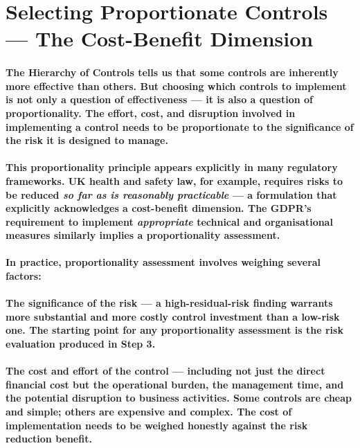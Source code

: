 \section{Selecting Proportionate Controls — The Cost-Benefit Dimension}
\paragraph{The Hierarchy of Controls tells us that some controls are inherently more effective than others. But choosing which controls to implement is not only a question of effectiveness — it is also a question of proportionality. The effort, cost, and disruption involved in implementing a control needs to be proportionate to the significance of the risk it is designed to manage.}
\paragraph{This proportionality principle appears explicitly in many regulatory frameworks. UK health and safety law, for example, requires risks to be reduced \textit{so far as is reasonably practicable} — a formulation that explicitly acknowledges a cost-benefit dimension. The GDPR's requirement to implement \textit{appropriate} technical and organisational measures similarly implies a proportionality assessment.}
\paragraph{In practice, proportionality assessment involves weighing several factors:}
\paragraph{\textbf{The significance of the risk} — a high-residual-risk finding warrants more substantial and more costly control investment than a low-risk one. The starting point for any proportionality assessment is the risk evaluation produced in Step 3.}
\paragraph{\textbf{The cost and effort of the control} — including not just the direct financial cost but the operational burden, the management time, and the potential disruption to business activities. Some controls are cheap and simple; others are expensive and complex. The cost of implementation needs to be weighed honestly against the risk reduction benefit.}
